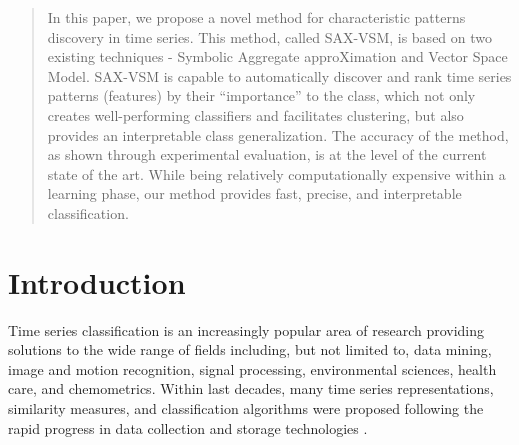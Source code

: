 \documentclass[conference]{IEEEtran}
\begin{document}
\maketitle


\begin{abstract}
In this paper, we propose a novel method for characteristic patterns discovery in 
time series. This method, called SAX-VSM, is based on two existing techniques - 
Symbolic Aggregate approXimation and Vector Space Model. SAX-VSM is capable 
to automatically discover and rank time series patterns (features) by their 
“importance” to the class, which not only creates well-performing classifiers
and facilitates clustering, but also provides an interpretable class generalization. 
The accuracy of the method, as shown through experimental evaluation, is at the 
level of the current state of the art. 
While being relatively computationally expensive within a learning phase, 
our method provides fast, precise, and interpretable classification.
\end{abstract}


%

\section{Introduction}
%
Time series classification is an increasingly popular area of research providing 
solutions to the wide range of fields including, but not limited to, data mining, 
image and motion recognition, signal processing, environmental sciences, 
health care, and chemometrics. 
Within last decades, many time series representations, similarity measures, 
and classification algorithms were proposed following the rapid
progress in data collection and storage technologies \cite{review}. 
\end{document}
